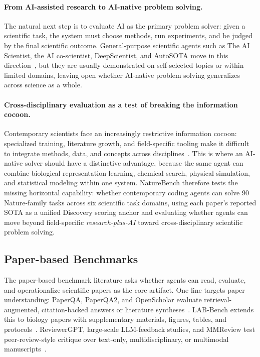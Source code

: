 \documentclass{llmxive}
\begin{document}
\paragraph{From AI-assisted research to AI-native problem solving.}
The natural next step is to evaluate AI as the primary problem solver: given a scientific task, the system must choose methods, run experiments, and be judged by the final scientific outcome. General-purpose scientific agents such as The AI Scientist, the AI co-scientist, DeepScientist, and AutoSOTA move in this direction~\citep{lu2026towards,gottweis2026accelerating,weng2025deepscientist,li2026autosota}, but they are usually demonstrated on self-selected topics or within limited domains, leaving open whether AI-native problem solving generalizes across science as a whole.

\paragraph{Cross-disciplinary evaluation as a test of breaking the information cocoon.}
Contemporary scientists face an increasingly restrictive information cocoon: specialized training, literature growth, and field-specific tooling make it difficult to integrate methods, data, and concepts across disciplines~\citep{hao2026artificial,zhou2025advancing,piao2023human}. This is where an AI-native solver should have a distinctive advantage, because the same agent can combine biological representation learning, chemical search, physical simulation, and statistical modeling within one system. NatureBench therefore tests the missing horizontal capability: whether contemporary coding agents can solve 90 Nature-family tasks across six scientific task domains, using each paper's reported SOTA as a unified Discovery scoring anchor and evaluating whether agents can move beyond field-specific \emph{research-plus-AI} toward cross-disciplinary scientific problem solving.







 
 
\subsection{Paper-based Benchmarks}
\label{sec:rel:paper}
The paper-based benchmark literature asks whether agents can read, evaluate, and operationalize scientific papers as the core artifact. One line targets paper understanding: PaperQA, PaperQA2, and OpenScholar evaluate retrieval-augmented, citation-backed answers or literature syntheses~\citep{lala2023paperqa,skarlinski2024paperqa2,asai2024openscholar}. LAB-Bench extends this to biology papers with supplementary materials, figures, tables, and protocols~\citep{laurent2024labbench}. ReviewerGPT, large-scale LLM-feedback studies, and MMReview test peer-review-style critique over text-only, multidisciplinary, or multimodal manuscripts~\citep{liu2023reviewergpt,liang2023llmfeedback,gao2025mmreview}.
\end{document}
